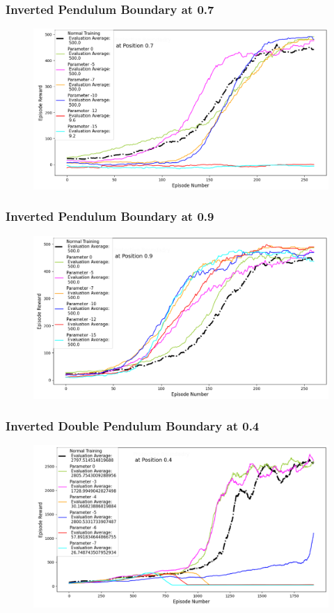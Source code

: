 \documentclass{beamer}
\begin{document}
\begin{frame}
\frametitle{Inverted Pendulum Boundary at 0.7}
\begin{figure}
    \centering
	\includegraphics[scale=0.4]{Cartpole_with_Boundary_at_0.7}
\end{figure}
\end{frame}

\begin{frame}
\frametitle{Inverted Pendulum Boundary at 0.9}
\begin{figure}
    \centering
	\includegraphics[scale=0.4]{Cartpole_with_Boundary_at_0.9}
\end{figure}
\end{frame}



\begin{frame}
\frametitle{Inverted Double Pendulum Boundary at 0.4}
\begin{figure}
    \centering
	\includegraphics[scale=0.4]{Double_Pendulum_with_Boundary_at_0.4}
\end{figure}
\end{frame}
\end{document}
